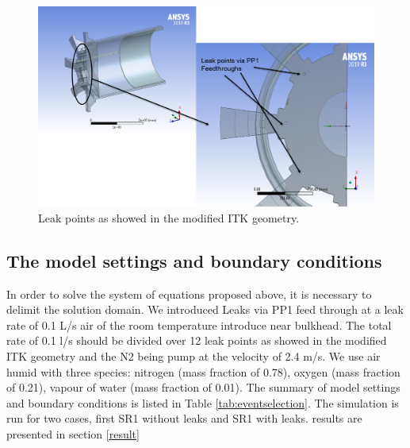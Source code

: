 \documentclass[a4paper]{jpconf}
\begin{document}
\begin{figure}[!ht]
\begin{center}
  \includegraphics[width=0.50\linewidth]{Picture12.png}
  \caption{ Leak points as showed in the modified ITK geometry. 
}
  \label{fig:5}
\end{center}
\end{figure}

\subsection{The model settings and boundary conditions}

In order to solve the system of equations proposed above, it is necessary to delimit the solution domain.
We introduced Leaks via PP1 feed through at a leak rate of 0.1 \mbox{L/s} air of the room temperature introduce near bulkhead. The total rate of 0.1 \mbox{l/s} should be divided over 12 leak points as showed in the modified ITK geometry and the N2 being pump at the velocity of 2.4 \mbox{m/s}. We use air humid with three species: nitrogen (mass fraction of 0.78), oxygen (mass fraction of 0.21), vapour of water (mass fraction of 0.01).
The summary of  model settings and boundary conditions is listed in Table \ref{tab:eventselection}. 
The simulation is run for two cases, first SR1 without leaks and SR1 with leaks. results are presented in section \ref{result}
\end{document}

